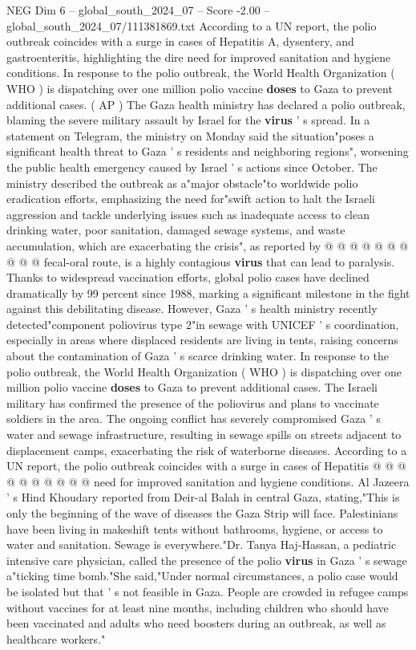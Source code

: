 \begin{textsample}{NEG Dim 6 – global\_south\_2024\_07 – Score -2.00 – global\_south\_2024\_07/111381869.txt}  \label{ex:f6_neg_127}
According to a UN report, the polio outbreak coincides with a surge in cases of Hepatitis A, dysentery, and gastroenteritis, highlighting the dire need for improved sanitation and hygiene conditions.
In response to the polio outbreak, the World Health Organization ( WHO ) is dispatching over one million polio vaccine \textbf{doses} to Gaza to prevent additional cases. ( AP ) The Gaza health ministry has declared a polio outbreak, blaming the severe military assault by Israel for the \textbf{virus} ' s spread.
In a statement on Telegram, the ministry on Monday said the situation"poses a significant health threat to Gaza ' s residents and neighboring regions", worsening the public health emergency caused by Israel ' s actions since October.
The ministry described the outbreak as a"major obstacle"to worldwide polio eradication efforts, emphasizing the need for"swift action to halt the Israeli aggression and tackle underlying issues such as inadequate access to clean drinking water, poor sanitation, damaged sewage systems, and waste accumulation, which are exacerbating the crisis", as reported by @ @ @ @ @ @ @ @ @ @ fecal-oral route, is a highly contagious \textbf{virus} that can lead to paralysis.
Thanks to widespread vaccination efforts, global polio cases have declined dramatically by 99 percent since 1988, marking a significant milestone in the fight against this debilitating disease.
However, Gaza ' s health ministry recently detected"component poliovirus type 2"in sewage with UNICEF ' s coordination, especially in areas where displaced residents are living in tents, raising concerns about the contamination of Gaza ' s scarce drinking water.
In response to the polio outbreak, the World Health Organization ( WHO ) is dispatching over one million polio vaccine \textbf{doses} to Gaza to prevent additional cases.
The Israeli military has confirmed the presence of the poliovirus and plans to vaccinate soldiers in the area.
The ongoing conflict has severely compromised Gaza ' s water and sewage infrastructure, resulting in sewage spills on streets adjacent to displacement camps, exacerbating the risk of waterborne diseases.
According to a UN report, the polio outbreak coincides with a surge in cases of Hepatitis @ @ @ @ @ @ @ @ @ @ need for improved sanitation and hygiene conditions.
Al Jazeera ' s Hind Khoudary reported from Deir-al Balah in central Gaza, stating,"This is only the beginning of the wave of diseases the Gaza Strip will face.
Palestinians have been living in makeshift tents without bathrooms, hygiene, or access to water and sanitation.
Sewage is everywhere."Dr.
Tanya Haj-Hassan, a pediatric intensive care physician, called the presence of the polio \textbf{virus} in Gaza ' s sewage a"ticking time bomb."She said,"Under normal circumstances, a polio case would be isolated but that ' s not feasible in Gaza.
People are crowded in refugee camps without vaccines for at least nine months, including children who should have been vaccinated and adults who need boosters during an outbreak, as well as healthcare workers."

\end{textsample}
